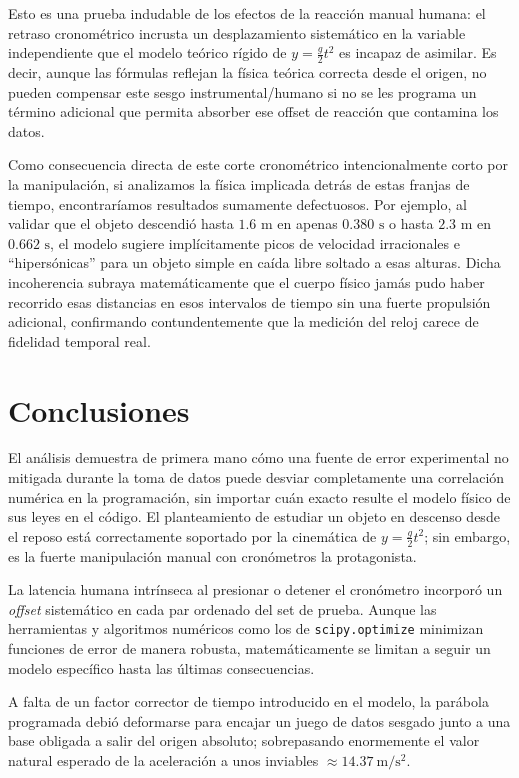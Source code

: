 \documentclass[12pt,a4paper]{article}
\begin{document}
Esto es una prueba indudable de los efectos de la reacción manual humana: el retraso cronométrico incrusta un desplazamiento sistemático en la variable independiente que el modelo teórico rígido de $y=\frac{g}{2}t^2$ es incapaz de asimilar. Es decir, aunque las fórmulas reflejan la física teórica correcta desde el origen, no pueden compensar este sesgo instrumental/humano si no se les programa un término adicional que permita absorber ese offset de reacción que contamina los datos.

Como consecuencia directa de este corte cronométrico intencionalmente corto por la manipulación, si analizamos la física implicada detrás de estas franjas de tiempo, encontraríamos resultados sumamente defectuosos. Por ejemplo, al validar que el objeto descendió hasta $1.6\text{ m}$ en apenas $0.380\text{ s}$ o hasta $2.3\text{ m}$ en $0.662\text{ s}$, el modelo sugiere implícitamente picos de velocidad irracionales e ``hipersónicas'' para un objeto simple en caída libre soltado a esas alturas. Dicha incoherencia subraya matemáticamente que el cuerpo físico jamás pudo haber recorrido esas distancias en esos intervalos de tiempo sin una fuerte propulsión adicional, confirmando contundentemente que la medición del reloj carece de fidelidad temporal real.

\vspace{1cm}
\section{Conclusiones}
El análisis demuestra de primera mano cómo una fuente de error experimental no mitigada durante la toma de datos puede desviar completamente una correlación numérica en la programación, sin importar cuán exacto resulte el modelo físico de sus leyes en el código. El planteamiento de estudiar un objeto en descenso desde el reposo está correctamente soportado por la cinemática de $y=\frac{g}{2}t^2$; sin embargo, es la fuerte manipulación manual con cronómetros la protagonista. 

La latencia humana intrínseca al presionar o detener el cronómetro incorporó un \textit{offset} sistemático en cada par ordenado del set de prueba. Aunque las herramientas y algoritmos numéricos como los de \texttt{scipy.optimize} minimizan funciones de error de manera robusta, matemáticamente se limitan a seguir un modelo específico hasta las últimas consecuencias. 

A falta de un factor corrector de tiempo introducido en el modelo, la parábola programada debió deformarse para encajar un juego de datos sesgado junto a una base obligada a salir del origen absoluto; sobrepasando enormemente el valor natural esperado de la aceleración a unos inviables $\approx14.37\ \mathrm{m/s^2}$. 
\end{document}

